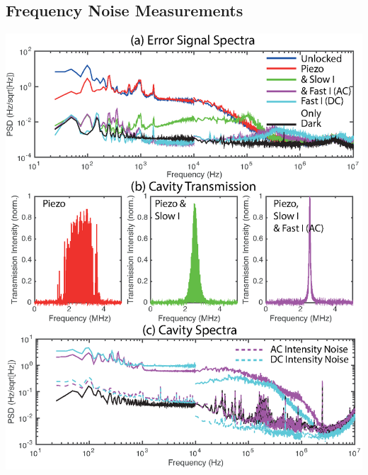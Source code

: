 \documentclass{article}
\newenvironment{Figure}
  {\par\medskip\noindent\minipage{\linewidth}}
  {\endminipage\par\medskip}
\begin{document}
\begin{multicols}{2}
\subsection{Frequency Noise Measurements}
\begin{Figure}
    \centering
    \captionsetup{type=figure}
    \includegraphics[width=\linewidth]{Figs/150904_SpectralDensityPlotsV102.eps}
    \caption{Frequency noise measurements. (a) \Gls*{lsd} {\color{red}(or is it PSD?)} measurements of polarization spectroscopy error signal frequency noise for a range of laser locking regimes: Piezo = piezo-only locking; Slow I = slow current feedback (40\,kHz bandwidth); Fast I = fast current feedback (maximum 14\,MHz bandwidth) either AC-coupled in combination with piezo and slow I feedback, or DC-coupled only. (b) Cavity transmission intensity as a function of AOM frequency. Cavity \gls*{fwhm} linewidth is 71.6\,kHz, scan time was 10\,ms. (c) \Gls*{lsd} measurements of transmitted cavity signal at half peak height for high-bandwidth locks. Also shown are the intensity noise of the laser, measured by removing the cavity and measuring frequency fluctuations with an intensity equal to half the peak transmission intensity. For (a) and (c) noise below $10^4$\,Hz was measured with a high dynamic range audio digitizer with a resolution bandwidth (RBW) of 12.2\,Hz; noise between $10^4$\textendash$10^6$\,Hz was measured with a spectrum analyzer with RBW of 30\,Hz, and measurements above $10^6$\,Hz were measured with a spectrum analyzer with a RBW of 300\,Hz.}
    \label{noise_measurement}
\end{Figure}


\end{multicols}
\end{document}
